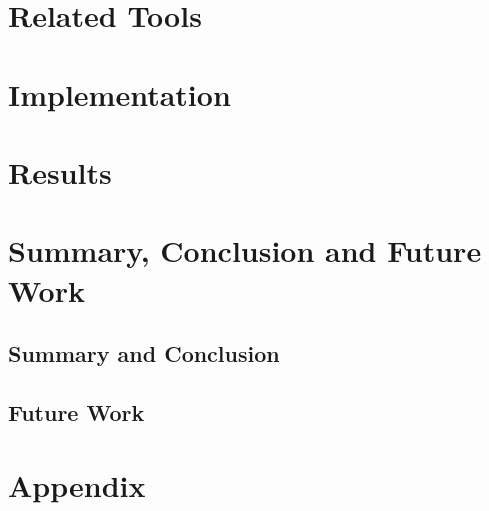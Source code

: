 \documentclass[conference]{IEEEtran}
\begin{document}
\section{Related Tools}



\section{Implementation}
\label{sec:impl}



\section{Results}
\label{sec:res}

%
%
%


    

\section{Summary, Conclusion and Future Work}
\subsection{Summary and Conclusion}
\subsection{Future Work}




\section{Appendix}



   




%
%
\end{document}
